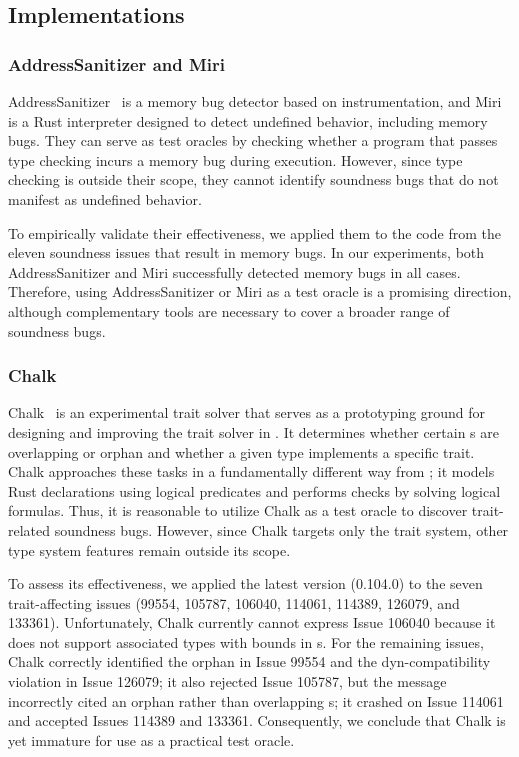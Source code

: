 \subsection{Implementations}

\subsubsection{AddressSanitizer and Miri}

AddressSanitizer~\cite{serebryany2012addresssanitizer} is a memory bug detector
based on instrumentation, and
%
Miri~\cite{jung2026miri, gh-miri} is a Rust interpreter designed to detect
undefined behavior, including memory bugs.
%
They can serve as test oracles by checking whether a program that passes type
checking incurs a memory bug during execution.
%
However, since type checking is outside their scope, they cannot identify
soundness bugs that do not manifest as undefined behavior.

To empirically validate their effectiveness, we applied them to the code from
the eleven soundness issues that result in memory bugs.
%
In our experiments, both AddressSanitizer and Miri successfully detected memory
bugs in all cases.
%
Therefore, using AddressSanitizer or Miri as a test oracle is a promising
direction, although complementary tools are necessary to cover a broader range
of soundness bugs.

\subsubsection{Chalk}

Chalk~\cite{gh-chalk} is an experimental trait solver that serves as a
prototyping ground for designing and improving the trait solver in \rustc{}.
%
It determines whether certain s are overlapping or orphan and whether a
given type implements a specific trait.
%
Chalk approaches these tasks in a fundamentally different way from \rustc{};
%
it models Rust declarations using logical predicates and performs checks by
solving logical formulas.
%
Thus, it is reasonable to utilize Chalk as a test oracle to discover
trait-related soundness bugs.
%
However, since Chalk targets only the trait system, other type system features
remain outside its scope.

To assess its effectiveness, we applied the latest version (0.104.0) to the
seven trait-affecting issues (99554, 105787, 106040, 114061, 114389, 126079, and
133361).
%
%
Unfortunately, Chalk currently cannot express Issue 106040 because it does not
support associated types with bounds in s.
%
For the remaining issues, Chalk correctly identified the orphan  in
Issue 99554 and the dyn-compatibility violation in Issue 126079;
%
it also rejected Issue 105787, but the message incorrectly cited an orphan
 rather than overlapping s;
%
it crashed on Issue 114061 and accepted Issues 114389 and 133361.
%
Consequently, we conclude that Chalk is yet immature for use as a practical test
oracle.

